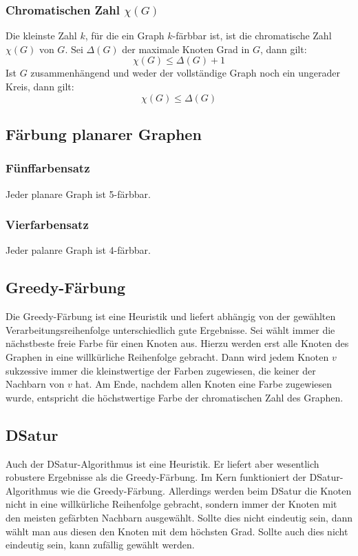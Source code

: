 \documentclass[10pt,a4paper,landscape]{article}
\begin{document}
\begin{multicols*}{2}
    \subsubsection*{ Chromatischen Zahl $\chi(G)$ }
    Die kleinste Zahl $k$, für die ein Graph $k$-färbbar ist, ist die chromatische Zahl $\chi(G)$ von $G$. Sei $\Delta(G)$ der maximale Knoten Grad in $G$, 
    dann gilt:
    \[ \chi(G) \leq \Delta(G) + 1 \]
    Ist $G$ zusammenhängend und weder der vollständige Graph noch ein ungerader Kreis, dann gilt:
    \[ \chi(G) \leq \Delta(G) \]

    \subsection{ Färbung planarer Graphen }
    \subsubsection*{ Fünffarbensatz }
    Jeder planare Graph ist 5-färbbar.
    \subsubsection*{ Vierfarbensatz }
    Jeder palanre Graph ist 4-färbbar.

    \subsection{ Greedy-Färbung }
    Die Greedy-Färbung ist eine Heuristik und liefert abhängig von der gewählten Verarbeitungsreihenfolge unterschiedlich gute Ergebnisse. Sei wählt immer die 
    nächstbeste freie Farbe für einen Knoten aus. Hierzu werden erst alle Knoten des Graphen in eine willkürliche Reihenfolge gebracht. Dann wird jedem Knoten 
    $v$ sukzessive immer die kleinstwertige der Farben zugewiesen, die keiner der Nachbarn von $v$ hat. Am Ende, nachdem allen Knoten eine Farbe zugewiesen wurde, 
    entspricht die höchstwertige Farbe der chromatischen Zahl des Graphen.

    \subsection{ DSatur }
    Auch der DSatur-Algorithmus ist eine Heuristik. Er liefert aber wesentlich robustere Ergebnisse als die Greedy-Färbung. Im Kern funktioniert der 
    DSatur-Algorithmus wie die Greedy-Färbung. Allerdings werden beim DSatur die Knoten nicht in eine willkürliche Reihenfolge gebracht, sondern immer der Knoten 
    mit den meisten gefärbten Nachbarn ausgewählt. Sollte dies nicht eindeutig sein, dann wählt man aus diesen den Knoten mit dem höchsten Grad. Sollte auch dies 
    nicht eindeutig sein, kann zufällig gewählt werden.


\end{multicols*}
\end{document}
